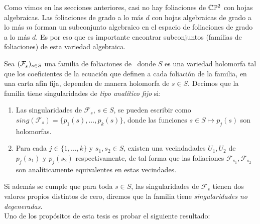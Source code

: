 Como vimos en las secciones anteriores, casi no hay foliaciones de $\mathbb{C}\mathbb{P}^2$ con hojas algebraicas. Las foliaciones de grado a lo más $d$ con hojas algebraicas de grado a lo más $m$ forman un subconjunto algebraico en el espacio de foliaciones de grado a lo más $d$. Es por eso que es importante encontrar subconjuntos (familias de foliaciones) de esta variedad algebraica.
\begin{defn}
\label{Def:TipoAnFijo}
Sea $(\mathcal{F}^{\ }_{s})_{s\in S}$ una familia de foliaciones de \CP\, donde $S$ es una variedad holomorfa tal que los coeficientes de la ecuación que definen a cada foliación de la familia, en una carta afín fija, dependen de manera holomorfa de $s\in S$. Decimos que la familia tiene singularidades de \emph{tipo analítico fijo} si:

\begin{enumerate}

\item Las singularidades de $\mathcal{F}_s$, $s\in S$, se pueden escribir como $\mathit{sing}(\mathcal{F}_s) = \{p_1(s),\ldots,p_k(s) \}$, donde las funciones $s\in S\mapsto p_j(s)$ son holomorfas.

\item Para cada $j\in\{1,\ldots,k\}$ y $s_1,s_2\in S$, existen una vecindadades $U_1,U_2$ de $p_j(s_1)$ y $p_j(s_2)$ respectivamente, de tal forma que las foliaciones $\mathcal{F}_{s_1},\mathcal{F}_{s_2}$  son analíticamente equivalentes en estas vecindades.
\end{enumerate}
\end{defn}

Si además se cumple que para toda $s\in S$, las singularidades de $\mathcal{F}_{s}$ tienen dos valores propios distintos de cero, diremos que la familia tiene \emph{singularidades no degeneradas}.
\\

Uno de los propósitos de esta tesis es probar el siguiente resultado:

